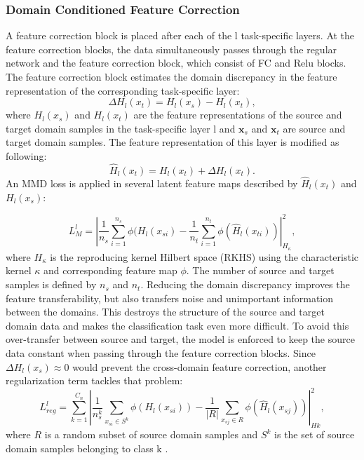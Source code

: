 {\subsubsection{Domain Conditioned Feature Correction}
A feature correction block is placed after each of the l task-specific layers. At the feature correction blocks, the data simultaneously passes through the regular network and the feature correction block, which consist of FC and Relu blocks. The feature correction block estimates the domain discrepancy in the feature representation of the corresponding task-specific layer:
\begin{equation}
    \Delta H_{l}(x_{t}) = H_{l}(x_{s}) - H_{l}(x_{t}),
\end{equation}
where $H_{l}(x_{s})$ and $H_{l}(x_{t})$ are the feature representations of the source and target domain samples in the task-specific layer l and $\pmb{x}_{s}$ and $\pmb{x}_{t}$ are source and target domain samples. The feature representation of this layer is modified as following:
\begin{equation}
    \hat{H}_{l}(x_{t}) = H_{l}(x_{t}) + \Delta H_{l}(x_{t}).
\end{equation}
An MMD loss is applied in several latent feature maps described by $\hat{H}_{l}(x_{t})$ and $H_{l}(x_{s})$:

\begin{equation}
    L_{M}^{l} = |\frac{1}{n_s} \sum_{i=1}^{n_{s}} \phi(H_{l}(x_{si}) - \frac{1}{n_t} \sum_{i=1}^{n_{t}} \phi(\hat{H}_{l}(x_{ti}))|_{H_{\kappa}}^{2}, 
\end{equation}
where $H_{\kappa}$ is the reproducing kernel Hilbert space (RKHS) using the characteristic kernel $\kappa$ and corresponding feature map  $\phi$. The number of source and target samples is defined by $n_{s}$ and $n_{t}$. Reducing the domain discrepancy improves the feature transferability, but also transfers noise and unimportant information between the domains. This destroys the structure of the source and target domain data and makes the classification task even more difficult. To avoid this over-transfer between source and target, the model is enforced to keep the source data constant when passing through the feature correction blocks. Since $\Delta H_{l}(x_{s}) \approx 0$ would prevent the cross-domain feature correction, another regularization term tackles that problem:
\begin{equation}
    L_{reg}^{l} = \sum_{k=1}^{C_{n}}|\frac{1}{n_{s}^{k}} \sum_{x_{si} \in S^{k}} \phi(H_{l}(x_{si})) - \frac{1}{|R|} \sum_{x_{sj} \in R} \phi(\hat{H}_{l}(x_{sj}))|_{Hk}^{2}, 
\end{equation}
where $R$ is a random subset of source domain samples and $S^{k}$ is the set of source domain samples belonging to class k \cite{li2020}.

}
